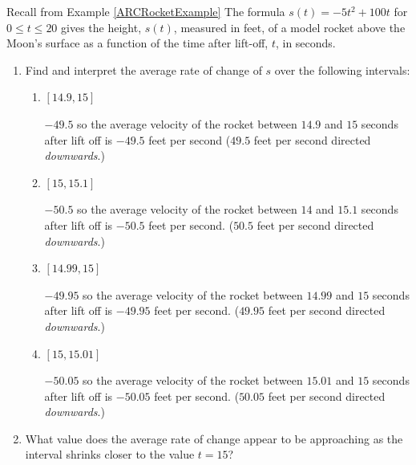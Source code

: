 \documentclass{ximera}
\begin{document}
\begin{problem}\label{IRCRocketExercise}
Recall from Example \ref{ARCRocketExample} The formula $s(t) = -5t^2+100t$ for $0 \leq t \leq 20$ gives the height, $s(t)$, measured in feet, of a model rocket above the Moon's surface as a function of the time after lift-off, $t$, in seconds.

\begin{enumerate}

\item  Find and interpret the average rate of change of $s$ over the following intervals:

\begin{enumerate}

\item $[14.9, 15]$

\begin{solution}
$-49.5$ so the average velocity of the rocket between $14.9$ and $15$ seconds after lift off is $-49.5$ feet per second ($49.5$ feet per second directed \textit{downwards}.)
\end{solution}

\item  $[15, 15.1]$

\begin{solution}
$-50.5$ so the average velocity of the rocket between $14$ and $15.1$ seconds after lift off is $-50.5$ feet per second. ($50.5$ feet per second directed \textit{downwards}.)
\end{solution}

\item  $[14.99, 15]$

\begin{solution}
$-49.95$ so the average velocity of the rocket between $14.99$ and $15$ seconds after lift off is $-49.95$ feet per second. ($49.95$ feet per second directed \textit{downwards}.)
\end{solution}

\item  $[15, 15.01]$

\begin{solution}
$-50.05$ so the average velocity of the rocket between $15.01$ and $15$ seconds after lift off is $-50.05$ feet per second. ($50.05$ feet per second directed \textit{downwards}.)
\end{solution}

\end{enumerate}

\item  What value does the average rate of change appear to be approaching as the interval shrinks closer to the value $t=15$?


\end{enumerate}
\end{problem}
\end{document}
